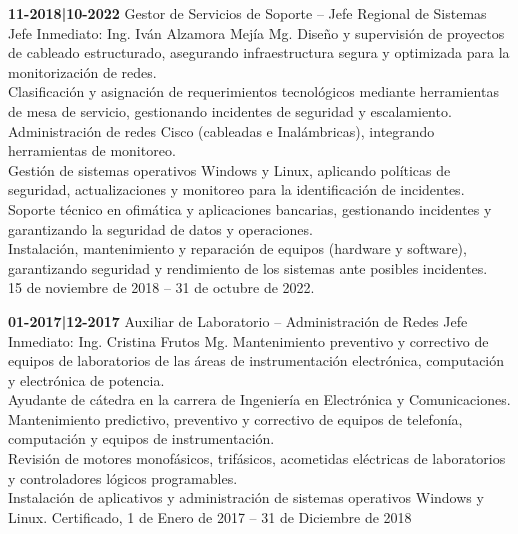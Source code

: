 \begin{levent}
    \cvevent
	{\textbf{11-2018|10-2022}}
	{Gestor de Servicios de Soporte -- Jefe Regional de Sistemas}
	{Jefe Inmediato: Ing. Iván Alzamora Mejía Mg.}
	{
	Diseño y supervisión de proyectos de cableado estructurado, asegurando infraestructura segura y optimizada para la monitorización de redes.\\
	Clasificación y asignación de requerimientos tecnológicos mediante herramientas de mesa de servicio, gestionando incidentes de seguridad y escalamiento.\\
	Administración de redes Cisco (cableadas e Inalámbricas), integrando herramientas de monitoreo.\\
	Gestión de sistemas operativos Windows y Linux, aplicando políticas de seguridad, actualizaciones y monitoreo para la identificación de incidentes.\\
	Soporte técnico en ofimática y aplicaciones bancarias, gestionando incidentes y garantizando la seguridad de datos y operaciones.\\
	Instalación, mantenimiento y reparación de equipos (hardware y software), garantizando seguridad y rendimiento de los sistemas ante posibles incidentes.\\
    }
	{15 de noviembre de 2018 – 31 de octubre de 2022.}
\end{levent}

\begin{devent}
    \cvevent
	{\textbf{01-2017|12-2017}}
	{Auxiliar de Laboratorio – Administración de Redes}
	{Jefe Inmediato: Ing. Cristina Frutos Mg.}
	{Mantenimiento preventivo y correctivo de equipos de laboratorios de las áreas de instrumentación electrónica, computación y electrónica de potencia.\\
	Ayudante de cátedra en la carrera de Ingeniería en Electrónica y Comunicaciones.\\
	Mantenimiento predictivo, preventivo y correctivo de equipos de telefonía, computación y equipos de instrumentación.\\ Revisión de motores monofásicos, trifásicos, acometidas eléctricas de laboratorios y controladores lógicos programables.\\
	Instalación de aplicativos y administración de  sistemas operativos Windows y Linux.
	}
	{Certificado,  1 de Enero de 2017 – 31 de Diciembre de 2018}
\end{devent}

